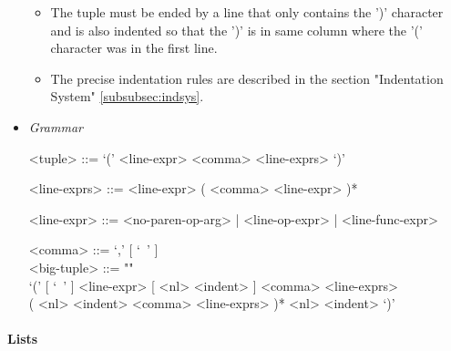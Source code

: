 \documentclass{article}
\begin{document}
\begin{itemize}
\begin{itemize}
\item
The tuple must be ended by a line that only contains the ')' character and is 
also indented so that the ')' is in same column where the '(' character was in
the first line.

\item
The precise indentation rules are described in the section
"Indentation System" \ref{subsubsec:indsys}.
\end{itemize}

\item \textit{Grammar}
\begin{grammar}
<tuple> ::= `(' <line-expr> <comma> <line-exprs> `)'

<line-exprs> ::= <line-expr> ( <comma> <line-expr> )*

<line-expr> ::= <no-paren-op-arg> | <line-op-expr> | <line-func-expr>

<comma> ::= `,' [ `\ ' ]
\\

<big-tuple> ::= ""\\
`(' [ `\ ' ] <line-expr> [ <nl> <indent> ] <comma> <line-exprs> \\
( <nl> <indent> <comma> <line-exprs> )* 
<nl> <indent> `)'
\end{grammar}

\end{itemize}

\paragraph{Lists}
\end{document}
